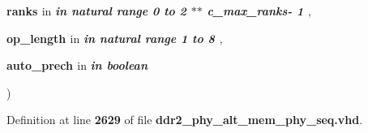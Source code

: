 {\begin{DoxyParamCaption}
\item[{}]{{\bfseries \textcolor{vhdlchar}{ranks}\textcolor{vhdlchar}{ }}\textcolor{stringliteral}{in} {\em {\bfseries \textcolor{keywordflow}{in}\textcolor{vhdlchar}{ }\textcolor{comment}{natural}\textcolor{vhdlchar}{ }\textcolor{vhdlchar}{ }\textcolor{vhdlchar}{ }\textcolor{keywordflow}{range}\textcolor{vhdlchar}{ }\textcolor{vhdlchar}{ } \textcolor{vhdldigit}{0} \textcolor{vhdlchar}{ }\textcolor{keywordflow}{to}\textcolor{vhdlchar}{ }\textcolor{vhdlchar}{ } \textcolor{vhdldigit}{2} \textcolor{vhdlchar}{$\ast$}\textcolor{vhdlchar}{$\ast$}\textcolor{vhdlchar}{ }\textcolor{vhdlchar}{ }\textcolor{vhdlchar}{ }\textcolor{vhdlchar}{c\+\_\+max\+\_\+ranks}\textcolor{vhdlchar}{-\/}\textcolor{vhdlchar}{ } \textcolor{vhdldigit}{1} \textcolor{vhdlchar}{ }}} , }
\item[{}]{{\bfseries \textcolor{vhdlchar}{op\+\_\+length}\textcolor{vhdlchar}{ }}\textcolor{stringliteral}{in} {\em {\bfseries \textcolor{keywordflow}{in}\textcolor{vhdlchar}{ }\textcolor{comment}{natural}\textcolor{vhdlchar}{ }\textcolor{vhdlchar}{ }\textcolor{vhdlchar}{ }\textcolor{keywordflow}{range}\textcolor{vhdlchar}{ }\textcolor{vhdlchar}{ } \textcolor{vhdldigit}{1} \textcolor{vhdlchar}{ }\textcolor{keywordflow}{to}\textcolor{vhdlchar}{ }\textcolor{vhdlchar}{ } \textcolor{vhdldigit}{8} \textcolor{vhdlchar}{ }}} , }
\item[{}]{{\bfseries \textcolor{vhdlchar}{auto\+\_\+prech}\textcolor{vhdlchar}{ }}\textcolor{stringliteral}{in} {\em {\bfseries \textcolor{keywordflow}{in}\textcolor{vhdlchar}{ }\textcolor{comment}{boolean}\textcolor{vhdlchar}{ }\textcolor{vhdlchar}{ }\textcolor{vhdlchar}{ }}}}
\end{DoxyParamCaption}
)\hspace{0.3cm}{\ttfamily [Function]}}\label{class__ddr2__phy__alt__mem__phy__addr__cmd__pkg_aa9735f89cd9a935bd598640693cb17e9}


Definition at line {\bf 2629} of file {\bf ddr2\+\_\+phy\+\_\+alt\+\_\+mem\+\_\+phy\+\_\+seq.\+vhd}.

